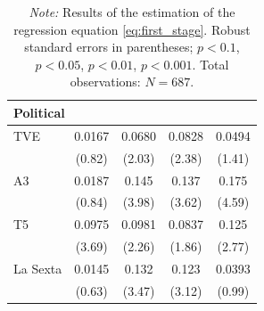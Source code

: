\documentclass[12pt]{article}
\begin{document}
\begin{table}[htbp]
\begin{tabular}{lcccc}
			\multicolumn{5}{l}{\textbf{Political}}\\
			\hline
			TVE            &  0.0167         &  0.0680\sym{*}   &  0.0828\sym{*}  &  0.0494         \\
			&  (0.82)         &  (2.03)         &  (2.38)         &  (1.41)         \\
			A3             &  0.0187         &  0.145\sym{***}  &  0.137\sym{***} &  0.175\sym{***} \\
			&  (0.84)         &  (3.98)         &  (3.62)         &  (4.59)         \\
			T5             &  0.0975\sym{***}&  0.0981\sym{*}   &  0.0837 &  0.125\sym{**}  \\
			&  (3.69)         &  (2.26)         &  (1.86)         &  (2.77)         \\
			La Sexta       &  0.0145         &  0.132\sym{***}  &  0.123\sym{**}  &  0.0393         \\
			&  (0.63)         &  (3.47)         &  (3.12)         &  (0.99)         \\
			\hline\hline
		\end{tabular}
		\caption*{\small \textit{Note:} Results of the estimation of the regression equation  \ref{eq:first_stage}.
			Robust standard errors in parentheses; 
			 $p<0.1$, \sym{*} $p<0.05$, \sym{**} $p<0.01$, \sym{***} $p<0.001$. 
			Total observations: $N=687$.}
	\end{table}
	
	
	
	
	
	
	
	
	
\end{document}
